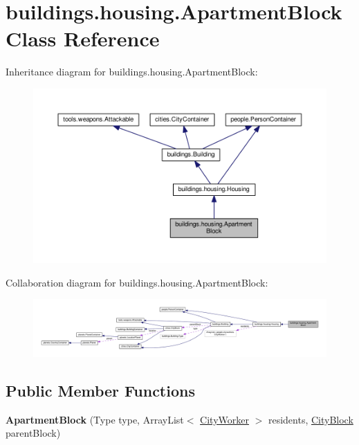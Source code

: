 \hypertarget{classbuildings_1_1housing_1_1_apartment_block}{}\section{buildings.\+housing.\+Apartment\+Block Class Reference}
\label{classbuildings_1_1housing_1_1_apartment_block}


Inheritance diagram for buildings.\+housing.\+Apartment\+Block\+:\nopagebreak
\begin{figure}[H]
\begin{center}
\leavevmode
\includegraphics[width=350pt]{classbuildings_1_1housing_1_1_apartment_block__inherit__graph}
\end{center}
\end{figure}


Collaboration diagram for buildings.\+housing.\+Apartment\+Block\+:\nopagebreak
\begin{figure}[H]
\begin{center}
\leavevmode
\includegraphics[width=350pt]{classbuildings_1_1housing_1_1_apartment_block__coll__graph}
\end{center}
\end{figure}
\subsection*{Public Member Functions}
\begin{DoxyCompactItemize}
\item 
{\bfseries Apartment\+Block} (Type type, Array\+List$<$ \hyperlink{classpeople_1_1cityworkers_1_1_city_worker}{City\+Worker} $>$ residents, \hyperlink{classcities_1_1_city_block}{City\+Block} parent\+Block)\hypertarget{classbuildings_1_1housing_1_1_apartment_block_ab7e83f8991e0ee5edcdf6973ea39d106}{}\label{classbuildings_1_1housing_1_1_apartment_block_ab7e83f8991e0ee5edcdf6973ea39d106}

\end{DoxyCompactItemize}

